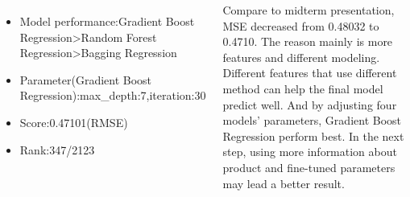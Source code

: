 \documentclass{tikzposter} %
\begin{document}
\begin{columns}
{}


{
\begin{itemize}
	\item Model performance:Gradient Boost Regression>Random Forest Regression>Bagging Regression
	\item Parameter(Gradient Boost Regression):max\_depth:7,iteration:30
	\item Score:0.47101(RMSE)
	\item Rank:347/2123
\end{itemize}
}


{
 Compare to midterm presentation, MSE decreased from 0.48032 to 0.4710. The reason mainly is more features and different modeling. Different features that use different method can help the final model predict well. And by adjusting four models' parameters, Gradient Boost Regression perform best. In the next step, using more information about product and fine-tuned parameters may lead a better result. 

}





\end{columns}


\end{document}
